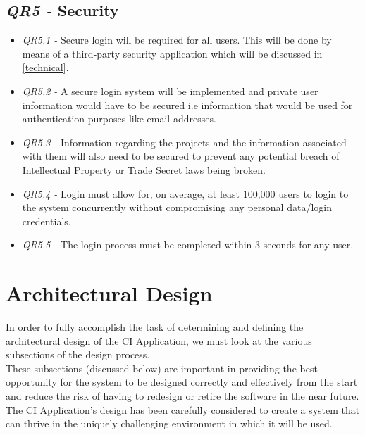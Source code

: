 \documentclass[11pt]{article}
\begin{document}
\subsection{\textit{QR5 -} Security}
\begin{itemize}
    \item \textit{QR5.1 -} Secure login will be required for all users. This will be done by means of a third-party security application which will be discussed in \ref{technical}.
    \item \textit{QR5.2 -} A secure login system will be implemented and private user information would have to be secured i.e information that would be used for authentication purposes like email addresses.
    \item \textit{QR5.3 -} Information regarding the projects and the information associated with them will also need to be secured to prevent any potential breach of Intellectual Property or Trade Secret laws being broken.
    \item \textit{QR5.4 -} Login must allow for, on average, at least 100,000 users to login to the system concurrently without compromising any personal data/login credentials.
    \item \textit{QR5.5 -} The login process must be completed within 3 seconds for any user.

\end{itemize}

\section{Architectural Design}
In order to fully accomplish the task of determining and defining the architectural design of the CI Application, we must look at the various subsections of the design process.\\[0.5cm]
These subsections (discussed below) are important in providing the best opportunity for the system to be designed correctly and effectively from the start and reduce the risk of having to redesign or retire the software in the near future.\\[0.5cm]
The CI Application's design has been carefully considered to create a system that can thrive in the uniquely challenging environment in which it will be used.\\[0.5cm]
\end{document}
